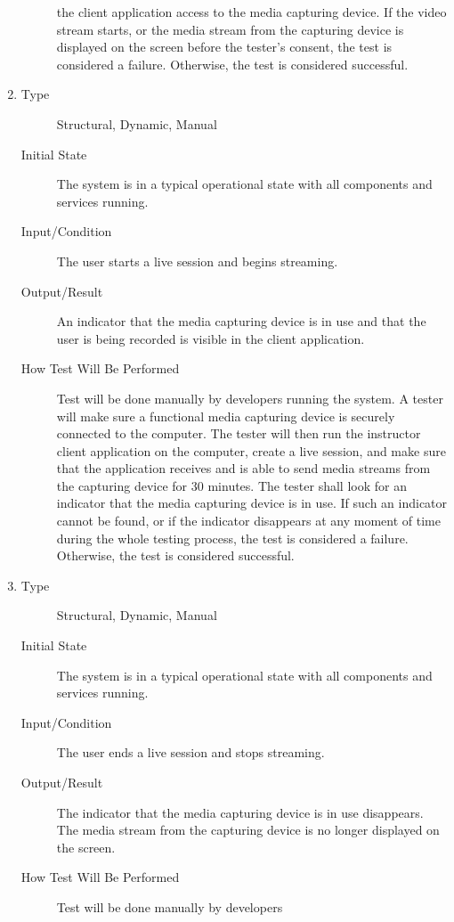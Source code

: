 \documentclass[12pt, titlepage]{article}
\begin{document}
\begin{enumerate}[NFR-T1]
\begin{description}
    the client application access to the media capturing device. If the video
    stream starts, or the media stream from the capturing device is displayed on
    the screen before the tester’s consent, the test is considered a failure.
    Otherwise, the test is considered successful.
  \end{description}
\item \label{NFRT25}
  \begin{description}
  \item[Type] Structural, Dynamic, Manual
  \item[Initial State] The system is in a typical operational state with all
    components and services running.
  \item[Input/Condition] The user starts a live session and begins streaming.
  \item[Output/Result] An indicator that the media capturing device is in use
    and that the user is being recorded is visible in the client application.
  \item[How Test Will Be Performed] Test will be done manually by developers
    running the system. A tester will make sure a functional media capturing
    device is securely connected to the computer. The tester will then run the
    instructor client application on the computer, create a live session, and
    make sure that the application receives and is able to send media streams
    from the capturing device for 30 minutes. The tester shall look for an
    indicator that the media capturing device is in use. If such an indicator
    cannot be found, or if the indicator disappears at any moment of time during
    the whole testing process, the test is considered a failure. Otherwise, the
    test is considered successful.
  \end{description}
\item \label{NFRT26}
  \begin{description}
  \item[Type] Structural, Dynamic, Manual
  \item[Initial State] The system is in a typical operational state with all
    components and services running.
  \item[Input/Condition] The user ends a live session and stops streaming.
  \item[Output/Result] The indicator that the media capturing device is in use
    disappears. The media stream from the capturing device is no longer
    displayed on the screen.
  \item[How Test Will Be Performed] Test will be done manually by developers

\end{description}
\end{enumerate}
\end{document}
